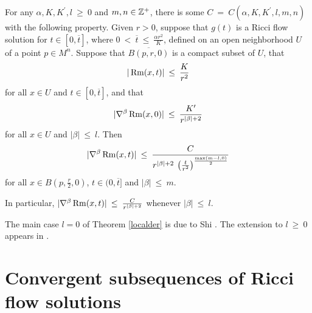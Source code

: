 \begin{theorem}
  \label{thm:kl-local-derivative-estimates-existence-local-derivative-estimates}
 \label{localder}
For any $\alpha, K, K^\prime, l \: \ge \: 0$ and $m, n \in {\mathbb Z}^+$,
there is some $C \: = \: C(\alpha, K, K^\prime, l,m, n)$ with the
following property.
Given $r > 0$,
suppose that $g(t)$ is a Ricci flow solution
for $t \in [0, \overline{t}]$, where $0 \: < \:
\overline{t} \: \le \:
\frac{\alpha r^2}{K}$, defined on an open neighborhood $U$ of a point
$p \in M^n$. Suppose that $\overline{B(p, r, 0)}$ is a compact
subset of $U$, that
\begin{equation}
|\operatorname{Rm}(x, t)| \: \le \: \frac{K}{r^{2}}
\end{equation}
for all $x \in U$ and $t \in [0, \overline{t}]$, and that
\begin{equation}
|\nabla^\beta \operatorname{Rm}(x, 0)| \: \le \: \frac{K^\prime}{r^{|\beta|+2}}
\end{equation}
for all $x \in U$ and $|\beta| \: \le \: l$.
Then
\begin{equation}
|\nabla^\beta \operatorname{Rm}(x, t)| \: \le \:
\frac{C}{
r^{|\beta|+2} \: \left( \frac{t}{r^2} \right)^{\frac{\max(m-l,0)}{2}}
}
\end{equation}
for all $x \in B \left(p, \frac{r}{2}, 0 \right)$,
$t \in (0, \overline{t}]$ and $|\beta| \: \le \: m$.

In particular,
$|\nabla^\beta \operatorname{Rm}(x, t)| \: \le \:
\frac{C}{r^{|\beta|+2}}$ whenever
$|\beta| \: \le \: l$.
\end{theorem}

The main case $l = 0$ of Theorem \ref{localder} is due to Shi
\cite{Shi2}. The extension to $l \: \ge \: 0$ appears in
\cite[Appendix B]{Lu-Tian}.

\section{Convergent subsequences of Ricci flow solutions}
\label{subsequence}

